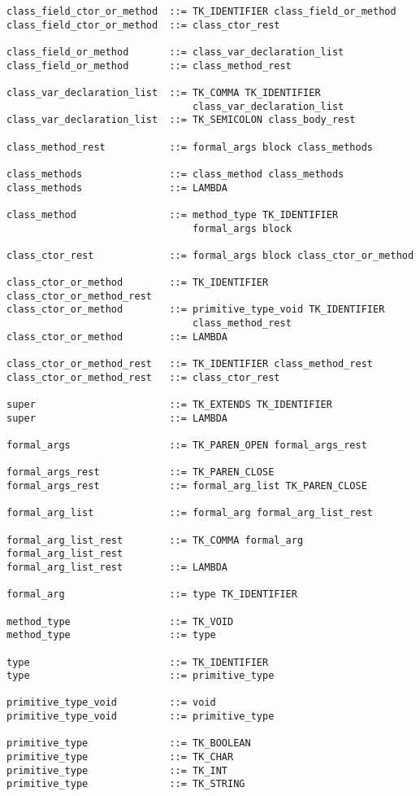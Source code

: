 \documentclass [a4paper,titlepage]{report}
\begin{document}
\begin{verbatim}
class_field_ctor_or_method  ::= TK_IDENTIFIER class_field_or_method
class_field_ctor_or_method  ::= class_ctor_rest

class_field_or_method       ::= class_var_declaration_list
class_field_or_method       ::= class_method_rest

class_var_declaration_list  ::= TK_COMMA TK_IDENTIFIER 
                                class_var_declaration_list
class_var_declaration_list  ::= TK_SEMICOLON class_body_rest

class_method_rest           ::= formal_args block class_methods

class_methods               ::= class_method class_methods
class_methods               ::= LAMBDA

class_method                ::= method_type TK_IDENTIFIER 
                                formal_args block

class_ctor_rest             ::= formal_args block class_ctor_or_method

class_ctor_or_method        ::= TK_IDENTIFIER class_ctor_or_method_rest
class_ctor_or_method        ::= primitive_type_void TK_IDENTIFIER 
                                class_method_rest 
class_ctor_or_method        ::= LAMBDA

class_ctor_or_method_rest   ::= TK_IDENTIFIER class_method_rest
class_ctor_or_method_rest   ::= class_ctor_rest

super                       ::= TK_EXTENDS TK_IDENTIFIER
super                       ::= LAMBDA

formal_args                 ::= TK_PAREN_OPEN formal_args_rest

formal_args_rest            ::= TK_PAREN_CLOSE
formal_args_rest            ::= formal_arg_list TK_PAREN_CLOSE

formal_arg_list             ::= formal_arg formal_arg_list_rest

formal_arg_list_rest        ::= TK_COMMA formal_arg formal_arg_list_rest
formal_arg_list_rest        ::= LAMBDA

formal_arg                  ::= type TK_IDENTIFIER

method_type                 ::= TK_VOID
method_type                 ::= type

type                        ::= TK_IDENTIFIER
type                        ::= primitive_type

primitive_type_void         ::= void
primitive_type_void         ::= primitive_type

primitive_type              ::= TK_BOOLEAN
primitive_type              ::= TK_CHAR
primitive_type              ::= TK_INT
primitive_type              ::= TK_STRING


\end{verbatim}
\end{document}
